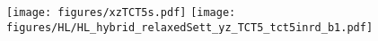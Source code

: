 
\begin{figure}
  \centering
  \texttt{[image: figures/xzTCT5s.pdf]}
  \texttt{[image: figures/HL/HL\_hybrid\_relaxedSett\_yz\_TCT5\_tct5inrd\_b1.pdf]}
  \caption{
    \label{}}
\end{figure}
